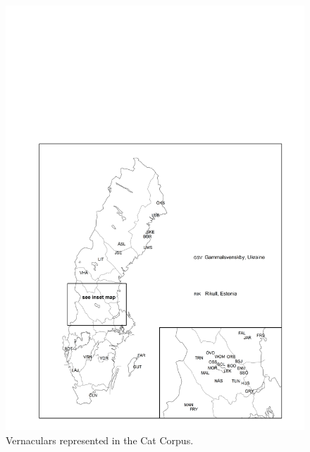 \begin{figure}[h]

\includegraphics[height=.5\textheight]{figures/4_VernacularsrepresentedCatCorpus}
\caption{Vernaculars represented in the Cat Corpus.}
\label{map:3}

\end{figure}

